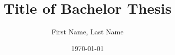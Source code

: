 \documentclass[12pt,a4paper,bibtotoc,numbers=noenddot]{scrreprt}
\author{First Name, Last Name}
\title{Title of Bachelor Thesis}
\date{\today}
\begin{document}





\tableofcontents
\listoffigures
\listoftables


\cleardoublepage
{}









\cleardoublepage
\renewcommand{\bibname}{References}





\end{document}

